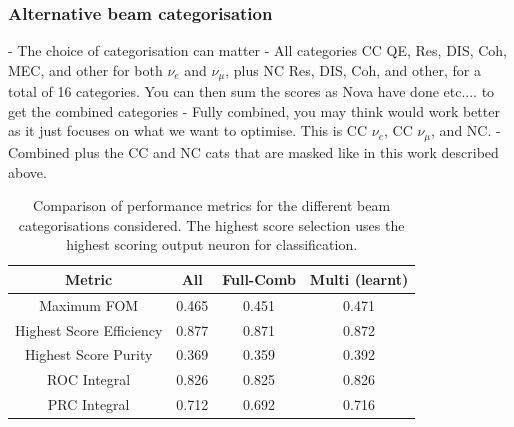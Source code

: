 \subsubsection*{Alternative beam categorisation} %

- The choice of categorisation can matter
- All categories CC QE, Res, DIS, Coh, MEC, and other for both $\nu_{e}$ and $\nu_{\mu}$, plus NC
Res, DIS, Coh, and other, for a total of 16 categories. You can then sum the scores as Nova have
done etc.... to get the combined categories
- Fully combined, you may think would work better as it just focuses on what we want to optimise.
This is CC $\nu_{e}$, CC $\nu_{\mu}$, and NC.
- Combined plus the CC and NC cats that are masked like in this work described above.

\begin{table}
    \begin{tabular}{cccc}
        Metric                   & All   & Full-Comb & Multi (learnt) \\
        \midrule
        Maximum FOM              & 0.465 & 0.451     & 0.471          \\
        Highest Score Efficiency & 0.877 & 0.871     & 0.872          \\
        Highest Score Purity     & 0.369 & 0.359     & 0.392          \\
        ROC Integral             & 0.826 & 0.825     & 0.826          \\
        PRC Integral             & 0.712 & 0.692     & 0.716          \\
    \end{tabular}
    \caption[Comparison of performance metrics for the different beam categorisations considered.]
    {Comparison of performance metrics for the different beam categorisations considered. The highest
        score selection uses the highest scoring output neuron for classification.}
    \label{tab:cat}
\end{table}



